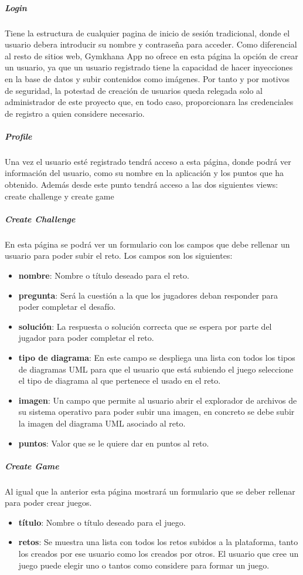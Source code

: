 \documentclass[a4paper, 12pt]{book}
\begin{document}
\subparagraph{Login}
Tiene la estructura de cualquier pagina de inicio de sesión tradicional, donde el usuario debera introducir su nombre y contraseña para acceder. Como diferencial al resto de sitios web, Gymkhana App no ofrece en esta página la opción de crear un usuario, ya que un usuario registrado tiene la capacidad de hacer inyecciones en la base de datos y subir contenidos como imágenes. Por tanto y por motivos de seguridad, la potestad de creación de usuarios queda relegada solo al administrador de este proyecto que, en todo caso, proporcionara las credenciales de registro a quien considere necesario.   

\subparagraph{Profile} Una vez el usuario esté registrado tendrá acceso a esta página, donde podrá ver información del usuario, como su nombre en la aplicación y los puntos que ha obtenido. Además desde este punto tendrá acceso a las dos siguientes views: create challenge y create game

\subparagraph{Create Challenge} En esta página se podrá ver un formulario con los campos que debe rellenar un usuario para poder subir el reto. Los campos son los siguientes:
\begin{itemize}
	\item \textbf {nombre}: Nombre o título deseado para el reto.
	\item \textbf {pregunta}: Será la cuestión a la que los jugadores deban responder para poder completar el desafío.
	\item \textbf {solución}: La respuesta o solución correcta que se espera por parte del jugador para poder completar el reto.
	\item \textbf {tipo de diagrama}: En este campo se despliega una lista con todos los tipos de diagramas UML para que el usuario que está subiendo el juego seleccione el tipo de diagrama al que pertenece el usado en el reto.
	\item \textbf {imagen}: Un campo que permite al usuario abrir el explorador de archivos de su sistema operativo para poder subir una imagen, en concreto se debe subir la imagen del diagrama UML asociado al reto. 
	\item \textbf {puntos}: Valor que se le quiere dar en puntos al reto.
\end{itemize}	

\subparagraph{Create Game} Al igual que la anterior esta página mostrará un formulario que se deber rellenar para poder crear juegos. 
\begin{itemize}
	\item \textbf {título}: Nombre o título deseado para el juego.
	\item \textbf {retos}: Se muestra una lista con todos los retos subidos a la plataforma, tanto los creados por ese usuario como los creados por otros. El usuario que cree un juego puede elegir uno o tantos como considere para formar un juego. 
\end{itemize}	
\end{document}
